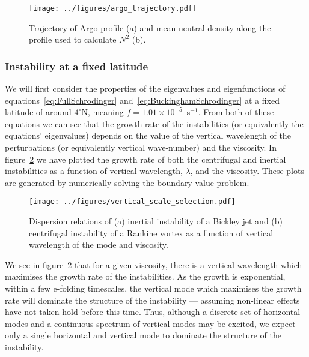 \begin{figure}
    \centering
    \texttt{[image: ../figures/argo\_trajectory.pdf]}
    \caption{Trajectory of Argo profile (a) and mean neutral density along the profile used to calculate $N^2$ (b).}
    \label{fig:InitialStratification}
\end{figure}

\subsubsection{Instability at a fixed latitude}
We will first consider the properties of the eigenvalues and eigenfunctions of equations~\ref{eq:FullSchrodinger} and~\ref{eq:BuckinghamSchrodinger} at a fixed latitude of around $4^\circ$N, meaning $f = 1.01 \times 10^{-5}$~s$^{-1}$. From both of these equations we can see that the growth rate of the instabilities (or equivalently the equations' eigenvalues) depends on the value of the vertical wavelength of the perturbations (or equivalently vertical wave-number) and the viscosity. In figure~\ref{fig:DispersionRelation} we have plotted the growth rate of both the centrifugal and inertial instabilities as a function of vertical wavelength, $\lambda$, and the viscosity. These plots are generated by numerically solving the boundary value problem.

\begin{figure}
    \centering
    \texttt{[image: ../figures/vertical\_scale\_selection.pdf]}
    \caption{Dispersion relations of (a) inertial instability of a Bickley jet and (b) centrifugal instability of a Rankine vortex as a function of vertical wavelength of the mode and viscosity.}
    \label{fig:DispersionRelation}
\end{figure}

We see in figure~\ref{fig:DispersionRelation} that for a given viscosity, there is a vertical wavelength which maximises the growth rate of the instabilities. As the growth is exponential, within a few e-folding timescales, the vertical mode which maximises the growth rate will dominate the structure of the instability --- assuming non-linear effects have not taken hold before this time. Thus, although a discrete set of horizontal modes and a continuous spectrum of vertical modes may be excited, we expect only a single horizontal and vertical mode to dominate the structure of the instability.



